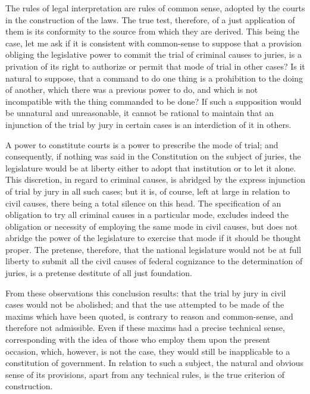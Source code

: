 The rules of legal interpretation are rules of common sense, adopted by the courts in the construction of the laws. The true test, therefore, of a just application of them is its conformity to the source from which they are derived. This being the case, let me ask if it is consistent with common-sense to suppose that a provision obliging the legislative power to commit the trial of criminal causes to juries, is a privation of its right to authorize or permit that mode of trial in other cases? Is it natural to suppose, that a command to do one thing is a prohibition to the doing of another, which there was a previous power to do, and which is not incompatible with the thing commanded to be done? If such a supposition would be unnatural and unreasonable, it cannot be rational to maintain that an injunction of the trial by jury in certain cases is an interdiction of it in others.

A power to constitute courts is a power to prescribe the mode of trial; and consequently, if nothing was said in the Constitution on the subject of juries, the legislature would be at liberty either to adopt that institution or to let it alone. This discretion, in regard to criminal causes, is abridged by the express injunction of trial by jury in all such cases; but it is, of course, left at large in relation to civil causes, there being a total silence on this head. The specification of an obligation to try all criminal causes in a particular mode, excludes indeed the obligation or necessity of employing the same mode in civil causes, but does not abridge the power of the legislature to exercise that mode if it should be thought proper. The pretense, therefore, that the national legislature would not be at full liberty to submit all the civil causes of federal cognizance to the determination of juries, is a pretense destitute of all just foundation.

From these observations this conclusion results: that the trial by jury in civil cases would not be abolished; and that the use attempted to be made of the maxims which have been quoted, is contrary to reason and common-sense, and therefore not admissible. Even if these maxims had a precise technical sense, corresponding with the idea of those who employ them upon the present occasion, which, however, is not the case, they would still be inapplicable to a constitution of government. In relation to such a subject, the natural and obvious sense of its provisions, apart from any technical rules, is the true criterion of construction.

